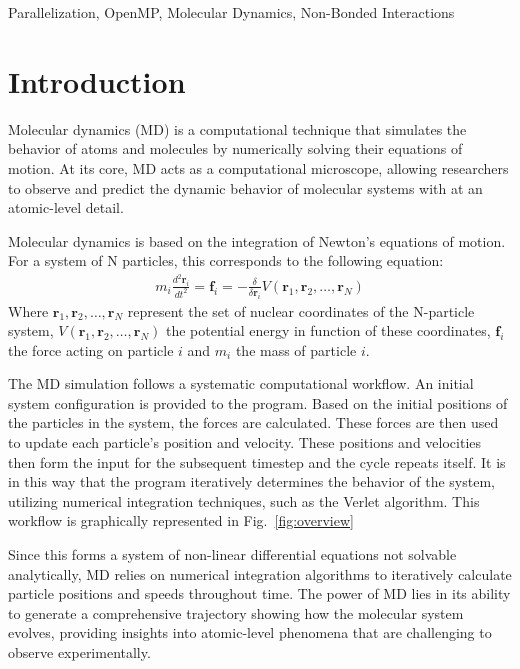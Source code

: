 \documentclass[conference]{IEEEtran}
\begin{document}
\begin{IEEEkeywords}
Parallelization, OpenMP, Molecular Dynamics, Non-Bonded Interactions
\end{IEEEkeywords}

\section{Introduction}
Molecular dynamics (MD) is a computational technique that simulates the behavior of atoms and molecules by numerically 
solving their equations of motion. At its core, MD acts as a computational microscope, allowing researchers to 
observe and predict the dynamic behavior of molecular systems with at an atomic-level detail.


Molecular dynamics is based on the integration of Newton's equations of motion. For a system of N particles, this
 corresponds to the following equation:
\begin{align}
    m_i \frac{d^2\mathbf{r}_i}{dt^2} = \mathbf{f}_i = -\frac{\delta}{\delta \mathbf{r}_i}V(\mathbf{r}_1,\mathbf{r}_2,\ldots,\mathbf{r}_N)
\end{align}
Where $\mathbf{r}_1,\mathbf{r}_2,\ldots,\mathbf{r}_N$ represent the set of nuclear coordinates of the N-particle system, 
$V(\mathbf{r}_1,\mathbf{r}_2,\ldots,\mathbf{r}_N)$ the potential energy in function of these coordinates, $\mathbf{f}_i$
the force acting on particle $i$ and $m_i$ the mass of particle $i$. 

The MD simulation follows a systematic computational workflow. An initial system configuration is provided to
the program. Based on the initial positions of the particles in the system, the forces are calculated. 
These forces are then used to 
update each particle's position and velocity. These positions and velocities then form the input for the subsequent
timestep and the cycle repeats itself. It is in this way that the program iteratively determines the behavior of the 
system, utilizing numerical 
integration techniques, such as the Verlet algorithm.
This workflow is graphically represented in Fig.~\ref{fig:overview}

Since this forms a system of non-linear differential equations not solvable analytically, MD relies on numerical 
integration algorithms to iteratively calculate particle positions and speeds throughout time. The power of MD 
lies in its ability to generate a comprehensive trajectory showing how the molecular system evolves, providing 
insights into atomic-level phenomena that are challenging to observe experimentally.
\end{document}

